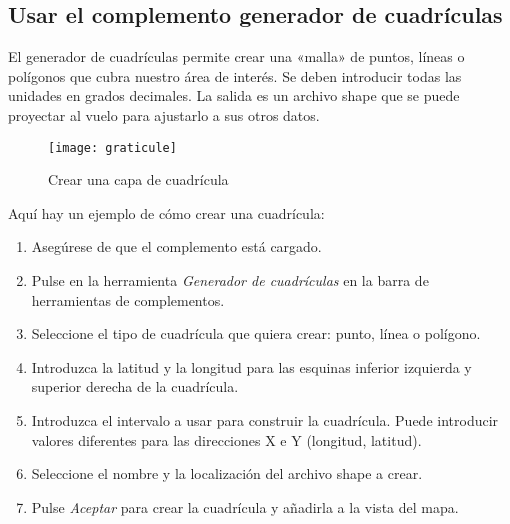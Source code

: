 \subsection{Usar el complemento generador de cuadrículas}

El generador de cuadrículas permite crear una «malla» de puntos, líneas o
polígonos que cubra nuestro área de interés. Se deben introducir todas las
unidades en grados decimales. La salida es un archivo shape que se puede
proyectar al vuelo para ajustarlo a sus otros datos.

\begin{figure}[ht]
\begin{center}
  \caption{Crear una capa de cuadrícula}\label{fig:graticule}\smallskip
  \texttt{[image: graticule]}
\end{center}
\end{figure}

Aquí hay un ejemplo de cómo crear una cuadrícula:

\begin{enumerate}
\item Asegúrese de que el complemento está cargado.
\item Pulse en la herramienta \textsl{Generador de cuadrículas} en la barra de herramientas de complementos.
\item Seleccione el tipo de cuadrícula que quiera crear: punto, línea o polígono.
\item Introduzca la latitud y la longitud para las esquinas inferior izquierda y superior derecha de la cuadrícula.
\item Introduzca el intervalo a usar para construir la cuadrícula. Puede introducir
  valores diferentes para las direcciones X e Y (longitud, latitud).
\item Seleccione el nombre y la localización del archivo shape a crear.
\item Pulse \textsl{Aceptar} para crear la cuadrícula y añadirla a la vista del mapa.
\end{enumerate} 


